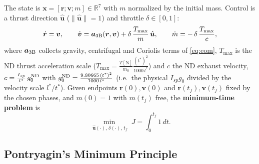 \documentclass[11pt]{article}
\newcommand{\Rv}{\bm{r}}
\newcommand{\Vv}{\bm{v}}
\newcommand{\uh}{\hat{\bm{u}}}
\begin{document}
The state is $\bm x = [\Rv; \Vv; m] \in \mathbb{R}^7$ with $m$ normalized
by the initial mass. Control is a thrust direction $\uh$
($\lVert\uh\rVert=1$) and throttle $\delta\in[0,1]$:
\begin{equation}
\dot{\Rv} = \Vv, \qquad
\dot{\Vv} = \bm a_{\rm 3B}(\Rv,\Vv) + \delta\,\frac{T_{\max}}{m}\,\uh, \qquad
\dot m = -\,\delta\,\frac{T_{\max}}{c},
\label{eq:dyn}
\end{equation}
where $\bm a_{\rm 3B}$ collects gravity, centrifugal and Coriolis terms of
\eqref{eq:eom}, $T_{\max}$ is the ND thrust acceleration scale
($T_{\max} = \frac{T[\mathrm N]}{m_0}\frac{(t^\ast)^2}{1000\,l^\ast}$) and
$c$ the ND exhaust velocity,
$c = \frac{I_{sp}}{t^\ast}\, g_0^{\rm ND}$ with
$g_0^{\rm ND} = \frac{9.80665\,(t^\ast)^2}{1000\,l^\ast}$ (i.e.\ the
physical $I_{sp}g_0$ divided by the velocity scale $l^\ast/t^\ast$). Given endpoints
$\Rv(0),\Vv(0)$ and $\Rv(t_f),\Vv(t_f)$ fixed by the chosen phases, and
$m(0)=1$ with $m(t_f)$ free, the \textbf{minimum-time problem} is
\begin{equation}
\min_{\;\uh(\cdot),\,\delta(\cdot),\,t_f}\; J = \int_0^{t_f}\! 1\, dt .
\end{equation}

\subsection{Pontryagin's Minimum Principle}
\end{document}
